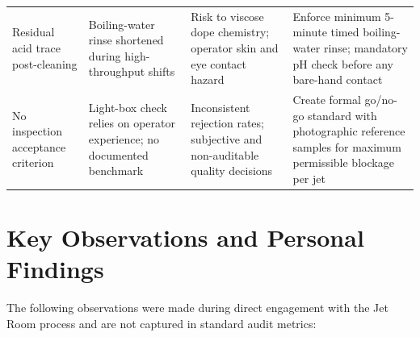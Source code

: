 \documentclass{book}
\begin{document}
\begin{longtable}{L{3cm} L{3.5cm} L{3.5cm} L{3.5cm}}
  Residual acid trace post-cleaning
  & Boiling-water rinse shortened during high-throughput shifts
  & Risk to viscose dope chemistry; operator skin and eye contact hazard
  & Enforce minimum 5-minute timed boiling-water rinse; mandatory pH check before any bare-hand contact \\

  No inspection acceptance criterion
  & Light-box check relies on operator experience; no documented benchmark
  & Inconsistent rejection rates; subjective and non-auditable quality decisions
  & Create formal go/no-go standard with photographic reference samples for maximum permissible blockage per jet \\
  \bottomrule
\end{longtable}

\section{Key Observations and Personal Findings}

The following observations were made during direct engagement with the Jet Room process and are not captured in standard audit metrics:
\end{document}
